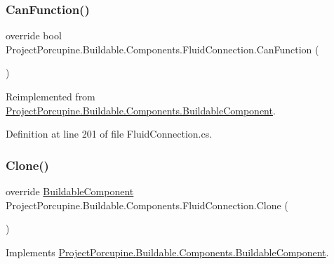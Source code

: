 \subsubsection{\texorpdfstring{Can\+Function()}{CanFunction()}}
{\footnotesize\ttfamily override bool Project\+Porcupine.\+Buildable.\+Components.\+Fluid\+Connection.\+Can\+Function (\begin{DoxyParamCaption}{ }\end{DoxyParamCaption})\hspace{0.3cm}{\ttfamily [virtual]}}



Reimplemented from \hyperlink{class_project_porcupine_1_1_buildable_1_1_components_1_1_buildable_component_a589203e44ce8de22262caead43ad38d6}{Project\+Porcupine.\+Buildable.\+Components.\+Buildable\+Component}.



Definition at line 201 of file Fluid\+Connection.\+cs.

\mbox{\label{class_project_porcupine_1_1_buildable_1_1_components_1_1_fluid_connection_aa280aa9d7723a5dad3ceecdba405c4ba}} 
\subsubsection{\texorpdfstring{Clone()}{Clone()}}
{\footnotesize\ttfamily override \hyperlink{class_project_porcupine_1_1_buildable_1_1_components_1_1_buildable_component}{Buildable\+Component} Project\+Porcupine.\+Buildable.\+Components.\+Fluid\+Connection.\+Clone (\begin{DoxyParamCaption}{ }\end{DoxyParamCaption})\hspace{0.3cm}{\ttfamily [virtual]}}



Implements \hyperlink{class_project_porcupine_1_1_buildable_1_1_components_1_1_buildable_component_acfe1aedeaf167118ca5d0d2b046e00fb}{Project\+Porcupine.\+Buildable.\+Components.\+Buildable\+Component}.



